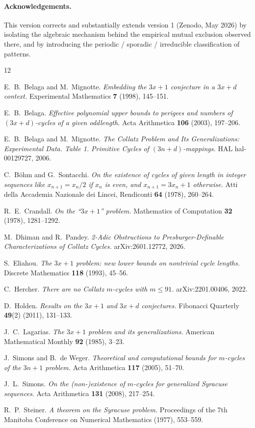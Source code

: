 \documentclass[11pt,a4paper]{article}
\theoremstyle{plain}
\theoremstyle{definition}
\begin{document}
\paragraph{Acknowledgements.}
This version corrects and substantially extends version 1
(Zenodo, May 2026) by isolating the algebraic mechanism behind the
empirical mutual exclusion observed there, and by introducing the
periodic / sporadic / irreducible classification of patterns.


\begin{thebibliography}{12}
\small

E.~B.~Belaga and M.~Mignotte.
\emph{Embedding the $3x+1$ conjecture in a $3x+d$ context.}
Experimental Mathematics \textbf{7} (1998), 145--151.

E.~B.~Belaga.
\emph{Effective polynomial upper bounds to perigees and numbers of
$(3x+d)$-cycles of a given oddlength.}
Acta Arithmetica \textbf{106} (2003), 197--206.

E.~B.~Belaga and M.~Mignotte.
\emph{The Collatz Problem and Its Generalizations: Experimental Data.
Table 1. Primitive Cycles of $(3n+d)$-mappings.}
HAL hal-00129727, 2006.

C.~B\"ohm and G.~Sontacchi.
\emph{On the existence of cycles of given length in integer sequences
like $x_{n+1} = x_n / 2$ if $x_n$ is even, and $x_{n+1} = 3 x_n + 1$
otherwise.}
Atti della Accademia Nazionale dei Lincei, Rendiconti \textbf{64}
(1978), 260--264.

R.~E.~Crandall.
\emph{On the ``$3x+1$'' problem.}
Mathematics of Computation \textbf{32} (1978), 1281--1292.

M.~Dhiman and R.~Pandey.
\emph{2-Adic Obstructions to Presburger-Definable Characterizations of
Collatz Cycles.}
arXiv:2601.12772, 2026.

S.~Eliahou.
\emph{The $3x+1$ problem: new lower bounds on nontrivial cycle lengths.}
Discrete Mathematics \textbf{118} (1993), 45--56.

C.~Hercher.
\emph{There are no Collatz $m$-cycles with $m \le 91$.}
arXiv:2201.00406, 2022.

D.~Holden.
\emph{Results on the $3x+1$ and $3x+d$ conjectures.}
Fibonacci Quarterly \textbf{49}(2) (2011), 131--133.

J.~C.~Lagarias.
\emph{The $3x+1$ problem and its generalizations.}
American Mathematical Monthly \textbf{92} (1985), 3--23.

J.~Simons and B.~de Weger.
\emph{Theoretical and computational bounds for $m$-cycles of the $3n+1$
problem.}
Acta Arithmetica \textbf{117} (2005), 51--70.

J.~L.~Simons.
\emph{On the (non-)existence of $m$-cycles for generalized Syracuse
sequences.}
Acta Arithmetica \textbf{131} (2008), 217--254.

R.~P.~Steiner.
\emph{A theorem on the Syracuse problem.}
Proceedings of the 7th Manitoba Conference on Numerical Mathematics
(1977), 553--559.

\end{thebibliography}
\end{document}
